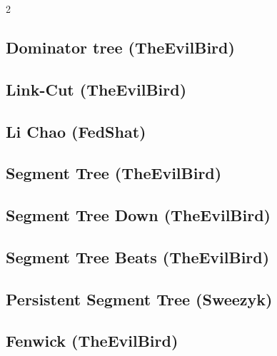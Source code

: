 \documentclass[a4paper]{article}
\begin{document}
\begin{multicols*}{2}
        \subsection{Dominator tree (TheEvilBird)}
            

        \subsection{Link-Cut (TheEvilBird)}
            
        
        \subsection{Li Chao (FedShat)}
            
            
        \subsection{Segment Tree (TheEvilBird)}
            
        
        \subsection{Segment Tree Down (TheEvilBird)}
            
        
        \subsection{Segment Tree Beats (TheEvilBird)}
            
        
        \subsection{Persistent Segment Tree (Sweezyk)}
            
            
        \subsection{Fenwick (TheEvilBird)}
            
        

\end{multicols*}
\end{document}
